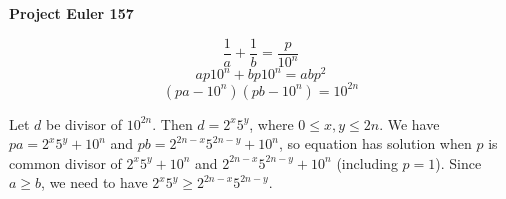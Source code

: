 \documentclass[a4paper,12pt]{article}
\begin{document}
\setlength\parindent{0pt}
\textbf{Project Euler 157}
\vspace{5ex}

\[\frac{1}{a} + \frac{1}{b} = \frac{p}{10^n}\]
\[ap10^n + bp10^n = abp^2\]
\[(pa - 10^n)(pb - 10^n) = 10^{2n}\]

Let \(d\) be divisor of \(10^{2n}\). Then \(d = 2^x5^y\), where \(0 \leq x, y \leq 2n\). We have
\(pa = 2^x5^y + 10^n\) and \(pb = 2^{2n - x}5^{2n - y} + 10^n\), so equation has solution when \(p\) is common divisor of \(2^x5^y + 10^n\) and \(2^{2n - x}5^{2n - y} + 10^n\) (including \(p = 1\)).
Since \(a \geq b\), we need to have \(2^x5^y \geq 2^{2n - x}5^{2n - y}\).
\end{document}

